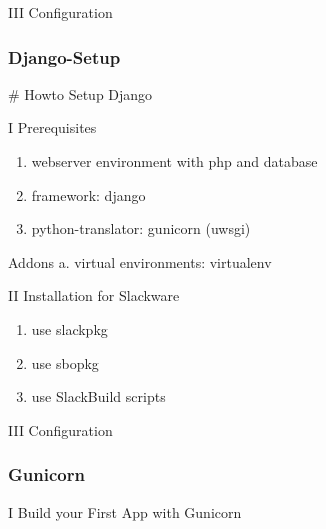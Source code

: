 \documentclass[letterpaper,10pt,english]{sphinxmanual}
\begin{document}
III Configuration


\subsubsection{Django-Setup}
\label{sdocs/django/django-setup/django-setup:django-setup}\label{sdocs/django/django-setup/django-setup::doc}
\# Howto Setup Django

I Prerequisites
\begin{enumerate}
\item {} 
webserver environment with php and database

\item {} 
framework: django

\item {} 
python-translator: gunicorn (uwsgi)

\end{enumerate}

Addons
a. virtual environments: virtualenv

II Installation for Slackware
\begin{enumerate}
\item {} 
use slackpkg

\item {} 
use sbopkg

\item {} 
use SlackBuild scripts

\end{enumerate}

III Configuration


\subsubsection{Gunicorn}
\label{sdocs/django/gunicorn/gunicorn::doc}\label{sdocs/django/gunicorn/gunicorn:gunicorn}
I Build your First App with Gunicorn
\end{document}
